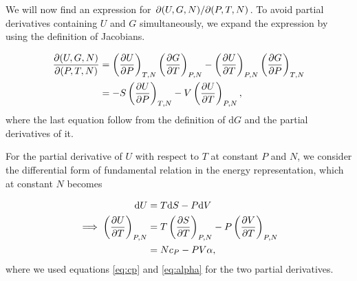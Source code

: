 \documentclass[reprint,english,notitlepage,aps,nobalancelastpage,nofootinbib]{revtex4-1}
\newcommand{\closed}[1]{\left(#1\right)}
\renewcommand{\cp}{c_P}
\renewcommand{\a}{\alpha}
\newcommand{\tmdv}[4]{\closed{\pdv{#1}{#2}}_{#3,#4}}
\newcommand{\jacobian}[2]{\pdv{(#1)}{(#2)}}
\renewcommand{\d}{\mathrm{d}}
\begin{document}
We will now find an expression for $\pdv*{(U,G,N)}{(P,T,N)}$. To avoid partial derivatives containing $U$ and $G$ simultaneously, we expand the expression by using the definition of Jacobians. 

\begin{align}
	\jacobian{U,G,N}{P,T,N} &= \tmdv{U}{P}{T}{N} \tmdv{G}{T}{P}{N} - \tmdv{U}{T}{P}{N}\tmdv{G}{P}{T}{N} \nonumber \\ 
	&= -S\tmdv{U}{P}{T}{N} - V \tmdv{U}{T}{P}{N}, \label{eq:d UGN_d PTN}
\end{align}
where the last equation follow from the definition of $\d G$ and the partial derivatives of it. 

For the partial derivative of $U$ with respect to $T$ at constant $P$ and $N$, we consider the differential form of fundamental relation in the energy representation, which at constant $N$ becomes 

\begin{align}
	\d U &= T \d S - P \d V \nonumber \\ 
	\implies \tmdv{U}{T}{P}{N} &= T \tmdv{S}{T}{P}{N} - P \tmdv{V}{T}{P}{N} \nonumber \\ 
	&= N\cp - PV\a, \label{eq:dU_dT}
\end{align}
where we used equations \eqref{eq:cp} and \eqref{eq:alpha} for the two partial derivatives. 
\end{document}
